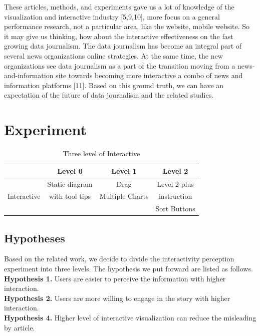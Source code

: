 \documentclass[9pt,journal,compsoc]{IEEEtran}
\begin{document}
These articles, methods, and experiments gave us a lot of knowledge of the visualization and interactive industry [5,9,10],  more focus on a general performance research, not a particular area, like the website, mobile website. So it may give us thinking, how about the interactive effectiveness on the fast growing data journalism. The data journalism has become an integral part of several news organizations online strategies. At the same time, the new organizations see data journalism as a part of the transition moving from a news-and-information site towards becoming more interactive a combo of news and information platforms [11]. Based on this ground truth, we can have an expectation of the future of data journalism and the related studies.   

\section{Experiment}
\large
\begin{table}
	\centering
		\begin{tabular}{|c|c|c|c|}
		\hline
     	&Level 0&Level 1&Level 2\\
     	\hline
            		&Static diagram&Drag & Level 2 plus\\ 
        Interactive& with tool tips&Multiple Charts& instruction\\
					&             &   			&Sort Buttons\\
     	\hline
        \end{tabular}
     \caption{Three level of Interactive}
\end{table}
\subsection{Hypotheses}
Based on the related work, we decide to divide the interactivity perception experiment into three levels. The hypothesis we put forward are listed as follows.\\
\textbf{Hypothesis 1.} Users are easier to perceive the information with higher interaction.\\
\textbf{Hypothesis 2.} Users are more willing to engage in the story with higher interaction.\\
\textbf{Hypothesis 4.} Higher level of interactive visualization can reduce the misleading by article.\\
\end{document}
